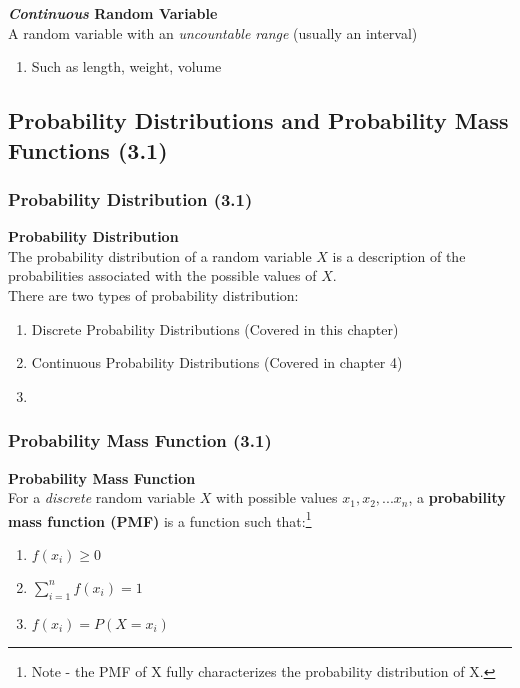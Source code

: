 \documentclass[../INDE315.tex]{subfiles}
\begin{document}
\begin{defn}
    \textbf{\emph{Continuous} Random Variable} \\
    A random variable with an \emph{uncountable range} (usually an interval)
    \begin{enumerate}
        \item Such as length, weight, volume
    \end{enumerate}
\end{defn}

\subsection*{Probability Distributions and Probability Mass Functions (3.1)}

\subsubsection*{Probability Distribution (3.1)}
\begin{defn}
    \textbf{Probability Distribution} \\
    The probability distribution of a random variable $X$ is a description of the probabilities associated with the possible values of $X$. \\
    There are two types of probability distribution:
    \begin{enumerate}
        \item Discrete Probability Distributions (Covered in this chapter)
        \item Continuous Probability Distributions (Covered in chapter 4)
        \item 
    \end{enumerate}
\end{defn}

\subsubsection*{Probability Mass Function (3.1)}
\begin{defn}
    \textbf{Probability Mass Function} \\
    For a \emph{discrete} random variable $X$ with possible values $x_1, x_2, ...x_n$, a \textbf{probability mass function (PMF)} is a function such that:\footnote{Note - the PMF of X fully characterizes the probability distribution of X.}
    \begin{enumerate}
        \item $f(x_i) \geq 0$
        \item $\sum_{i=1}^{n} f(x_i) = 1$
        \item $f(x_i) = P(X = x_i)$
    \end{enumerate}
\end{defn}
\end{document}
